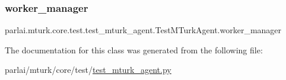 \subsubsection{\texorpdfstring{worker\+\_\+manager}{worker\_manager}}
{\footnotesize\ttfamily parlai.\+mturk.\+core.\+test.\+test\+\_\+mturk\+\_\+agent.\+Test\+M\+Turk\+Agent.\+worker\+\_\+manager}



The documentation for this class was generated from the following file\+:\begin{DoxyCompactItemize}
\item 
parlai/mturk/core/test/\hyperlink{test_2test__mturk__agent_8py}{test\+\_\+mturk\+\_\+agent.\+py}\end{DoxyCompactItemize}
